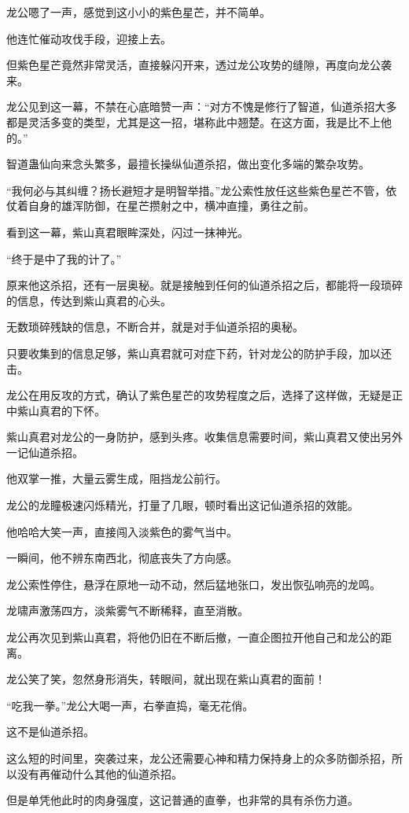 \begin{this_body}
龙公嗯了一声，感觉到这小小的紫色星芒，并不简单。

他连忙催动攻伐手段，迎接上去。

但紫色星芒竟然非常灵活，直接躲闪开来，透过龙公攻势的缝隙，再度向龙公袭来。

龙公见到这一幕，不禁在心底暗赞一声：“对方不愧是修行了智道，仙道杀招大多都是灵活多变的类型，尤其是这一招，堪称此中翘楚。在这方面，我是比不上他的。”

智道蛊仙向来念头繁多，最擅长操纵仙道杀招，做出变化多端的繁杂攻势。

“我何必与其纠缠？扬长避短才是明智举措。”龙公索性放任这些紫色星芒不管，依仗着自身的雄浑防御，在星芒攒射之中，横冲直撞，勇往之前。

看到这一幕，紫山真君眼眸深处，闪过一抹神光。

“终于是中了我的计了。”

原来他这杀招，还有一层奥秘。就是接触到任何的仙道杀招之后，都能将一段琐碎的信息，传达到紫山真君的心头。

无数琐碎残缺的信息，不断合并，就是对手仙道杀招的奥秘。

只要收集到的信息足够，紫山真君就可对症下药，针对龙公的防护手段，加以还击。

龙公在用反攻的方式，确认了紫色星芒的攻势程度之后，选择了这样做，无疑是正中紫山真君的下怀。

紫山真君对龙公的一身防护，感到头疼。收集信息需要时间，紫山真君又使出另外一记仙道杀招。

他双掌一推，大量云雾生成，阻挡龙公前行。

龙公的龙瞳极速闪烁精光，打量了几眼，顿时看出这记仙道杀招的效能。

他哈哈大笑一声，直接闯入淡紫色的雾气当中。

一瞬间，他不辨东南西北，彻底丧失了方向感。

龙公索性停住，悬浮在原地一动不动，然后猛地张口，发出恢弘响亮的龙鸣。

龙啸声激荡四方，淡紫雾气不断稀释，直至消散。

龙公再次见到紫山真君，将他仍旧在不断后撤，一直企图拉开他自己和龙公的距离。

龙公笑了笑，忽然身形消失，转眼间，就出现在紫山真君的面前！

“吃我一拳。”龙公大喝一声，右拳直捣，毫无花俏。

这不是仙道杀招。

这么短的时间里，突袭过来，龙公还需要心神和精力保持身上的众多防御杀招，所以没有再催动什么其他的仙道杀招。

但是单凭他此时的肉身强度，这记普通的直拳，也非常的具有杀伤力道。


\end{this_body}
